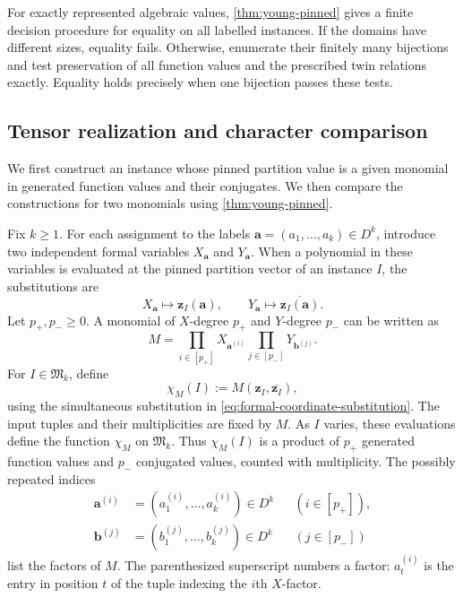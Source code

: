 \documentclass[11pt,letterpaper,onecolumn]{article}
\theoremstyle{plain}
\theoremstyle{definition}
\theoremstyle{remark}
\newcommand{\zvec}[1]{\mathbf z_{#1}}
\newcommand{\InstMonoid}[1]{\mathfrak M_{#1}}
\begin{document}
For exactly represented algebraic values, \cref{thm:young-pinned} gives a
finite decision procedure for equality on all labelled instances.  If the domains
have different sizes, equality fails.  Otherwise, enumerate their finitely
many bijections and test preservation of all function values and the
prescribed twin relations exactly.  Equality holds precisely when one
bijection passes these tests.

\subsection{Tensor realization and character comparison}
\label{subsec:tensor-comparison}

We first construct an instance whose pinned partition value is a given
monomial in generated function values and their conjugates.  We then
compare the constructions for two monomials using
\cref{thm:young-pinned}.

Fix $k\ge1$.  For each assignment to the labels
$\mathbf a=(a_1,\ldots,a_k)\in D^k$, introduce two independent formal
variables $X_{\mathbf a}$ and $Y_{\mathbf a}$.  When a polynomial in these
variables is evaluated at the pinned partition vector of an instance $I$,
the substitutions are
\begin{equation}
  X_{\mathbf a}\longmapsto\zvec I(\mathbf a),
  \qquad
  Y_{\mathbf a}\longmapsto\overline{\zvec I(\mathbf a)}.
  \label{eq:formal-coordinate-substitution}
\end{equation}
Let $p_+,p_-\ge0$.  A monomial of $X$-degree $p_+$ and $Y$-degree
$p_-$ can be written as
\begin{equation*}
  M=\prod_{i\in[p_+]}X_{\mathbf a^{(i)}}
    \prod_{j\in[p_-]}Y_{\mathbf b^{(j)}}.
\end{equation*}
For $I\in\InstMonoid{k}$, define
\begin{equation*}
  \chi_M(I):=M(\zvec I,\overline{\zvec I}),
\end{equation*}
using the simultaneous substitution in
\eqref{eq:formal-coordinate-substitution}.  The input tuples and their
multiplicities are fixed by $M$.  As $I$ varies, these evaluations define
the function $\chi_M$ on $\InstMonoid{k}$.  Thus $\chi_M(I)$ is a
product of $p_+$ generated function values and $p_-$ conjugated values,
counted with multiplicity.
The possibly repeated indices
\[
\begin{aligned}
  \mathbf a^{(i)}&=(a_1^{(i)},\ldots,a_k^{(i)})\in D^k
    &&(i\in[p_+]),\\
  \mathbf b^{(j)}&=(b_1^{(j)},\ldots,b_k^{(j)})\in D^k
    &&(j\in[p_-])
\end{aligned}
\]
list the factors of $M$.  The parenthesized superscript numbers a factor:
$a_t^{(i)}$ is the entry in position $t$ of the tuple indexing
the $i$th $X$-factor.
\end{document}
